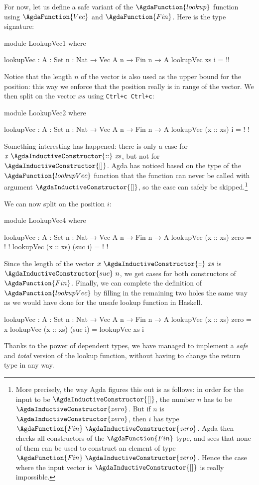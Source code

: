 \documentclass[a4paper,UKenglish]{tufte-handout}
\theoremstyle{definition}
\newcommand\var[1]{\mathit{#1}}
\newcommand\fun[1]{{\AgdaFunction{#1}}}
\newcommand\data[1]{{\AgdaFunction{#1}}}
\newcommand\con[1]{{\AgdaInductiveConstructor{#1}}}
\newcommand\zero{\con{zero}}
\newcommand\suc{\con{suc}}
\renewcommand\Vec{\data{Vec}}
\newcommand\nil{\con{[]}}
\newcommand\cons{\con{::}}
\newcommand\Fin{\data{Fin}}
\begin{document}
For now, let us define a safe variant of the $\fun{lookup}$ function
using $\Vec$ and $\Fin$. Here is the type signature:
\begin{code}[hide]
module LookupVec1 where
\end{code}
\begin{code}[number]
  lookupVec : {A : Set} {n : Nat} → Vec A n → Fin n → A
  lookupVec xs i = {!!}
\end{code}
Notice that the length $n$ of the vector is also used as the upper
bound for the position: this way we enforce that the position really is in
range of the vector. We then split on the vector $\var{xs}$ using \texttt{Ctrl+c Ctrl+c}:
\begin{code}[hide]
module LookupVec2 where
\end{code}
\begin{code}[number]
  lookupVec : {A : Set} {n : Nat} → Vec A n → Fin n → A
  lookupVec (x :: xs) i = {!  !}
\end{code}
Something interesting has happened: there is only a case for
$\var{x}\ \cons\ \var{xs}$, but not for $\nil$. Agda has noticed
based on the type of the $\fun{lookupVec}$ function that the function
can never be called with argument $\nil$, so the case can safely
be skipped.\footnote{More precisely, the way Agda figures this out is
as follows: in order for the input to be $\nil$, the number
$\var{n}$ has to be $\zero$. But if $\var{n}$ is $\zero$, then
$\var{i}$ has type $\Fin\ \zero$. Agda then checks all constructors of
the $\Fin$ type, and sees that none of them can be used to construct
an element of type $\Fin\ \zero$. Hence the case where the input vector
is $\nil$ is really impossible.}

We can now split on the position $i$:
\begin{code}[hide]
module LookupVec4 where
\end{code}
\begin{code}[number]
  lookupVec : {A : Set} {n : Nat} → Vec A n → Fin n → A
  lookupVec (x :: xs)  zero     = {!  !}
  lookupVec (x :: xs)  (suc i)  = {!  !}
\end{code}
Since the length of the vector $x\ \cons\ \var{xs}$ is $\suc\ n$,
we get cases for both constructors of $\Fin$.
Finally, we can complete the definition of $\fun{lookupVec}$ by
filling in the remaining two holes the same way as we would have done
for the unsafe lookup function in Haskell.
\begin{code}[number]
lookupVec : {A : Set} {n : Nat} → Vec A n → Fin n → A
lookupVec (x :: xs)  zero     = x
lookupVec (x :: xs)  (suc i)  = lookupVec xs i
\end{code}
Thanks to the power of dependent types, we have managed to implement a
\emph{safe} and \emph{total} version of the lookup function, without
having to change the return type in any way.
\end{document}
